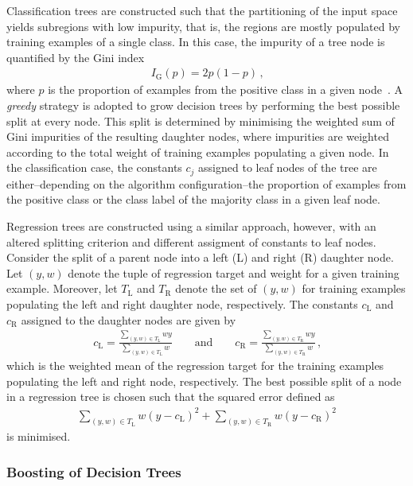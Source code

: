Classification trees are constructed such that the partitioning of the input
space yields subregions with low impurity, that is, the regions are mostly
populated by training examples of a single class. In this case, the impurity of
a tree node is quantified by the Gini index
\begin{align*}
  I_{\text{G}}(p) = 2 p (1 - p) \,\text{,}
\end{align*}
where $p$ is the proportion of examples from the positive class in a given
node~\cite{hastie09}. A \emph{greedy} strategy is adopted to grow decision trees
by performing the best possible split at every node. This split is determined by
minimising the weighted sum of Gini impurities of the resulting daughter nodes,
where impurities are weighted according to the total weight of training examples
populating a given node. In the classification case, the constants $c_j$
assigned to leaf nodes of the tree are either--depending on the algorithm
configuration--the proportion of examples from the positive class or the class
label of the majority class in a given leaf node.

Regression trees are constructed using a similar approach, however, with an
altered splitting criterion and different assigment of constants to leaf
nodes. Consider the split of a parent node into a left (L) and right (R)
daughter node. Let $(y, w)$ denote the tuple of regression target and weight for
a given training example. Moreover, let $T_{\text{L}}$ and $T_{\text{R}}$ denote
the set of $(y, w)$ for training examples populating the left and right daughter
node, respectively. The constants $c_{\text{L}}$ and $c_{\text{R}}$ assigned to
the daughter nodes are given by
\begin{align*}
  c_{\text{L}} = \frac{\sum_{(y, w) \in T_{\text{L}}} w y}{\sum_{(y, w) \in T_{\text{L}}} w} \qquad \text{and} \qquad c_{\text{R}} = \frac{\sum_{(y, w) \in T_{\text{R}}} w y}{\sum_{(y, w) \in T_{\text{R}}} w} \,\text{,}
\end{align*}
which is the weighted mean of the regression target for the training examples
populating the left and right node, respectively. The best possible split of a
node in a regression tree is chosen such that the squared error defined as
\begin{align*}
  \sum_{(y, w) \in T_{\text{L}}} w (y - c_{\text{L}})^2 + \sum_{(y, w) \in T_{\text{R}} } w (y - c_{\text{R}})^2
\end{align*}
is minimised.


\subsubsection{Boosting of Decision Trees}


